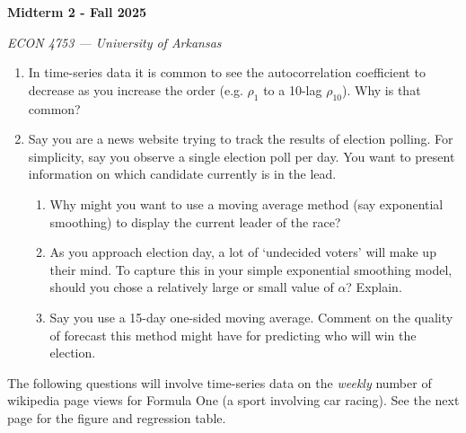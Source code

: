 \documentclass[12pt]{article}
\begin{document}
\begin{center}
  {\Huge\bf Midterm 2 - Fall 2025}
  
  \smallskip
  {\large\it ECON 4753 — University of Arkansas}
\end{center}

\vspace{5mm}
\begin{enumerate}
  \item In time-series data it is common to see the autocorrelation coefficient to decrease as you increase the order (e.g. $\rho_1$ to a 10-lag $\rho_{10}$). 
  Why is that common?
  
  \bigskip
  \item Say you are a news website trying to track the results of election polling. 
  For simplicity, say you observe a single election poll per day. 
  You want to present information on which candidate currently is in the lead.

  \medskip
  \begin{enumerate}[label=(\alph*)]
    \item Why might you want to use a moving average method (say exponential smoothing) to display the current leader of the race?

    \item As you approach election day, a lot of `undecided voters' will make up their mind. 
    To capture this in your simple exponential smoothing model, should you chose a relatively large or small value of $\alpha$? 
    Explain.

    \item Say you use a 15-day one-sided moving average. Comment on the quality of forecast this method might have for predicting who will win the election.
  \end{enumerate}

\end{enumerate}

\newpage
The following questions will involve time-series data on the \emph{weekly} number of wikipedia page views for Formula One (a sport involving car racing). 
See the next page for the figure and regression table.
\end{document}
